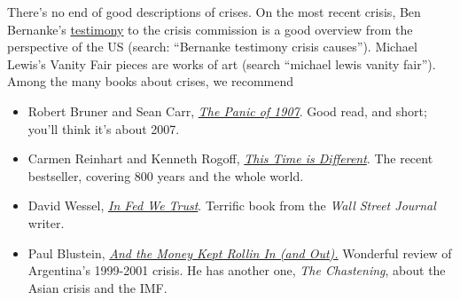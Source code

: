 There's no end of good descriptions of crises.
On the most recent crisis, Ben Bernanke's 
\href{http://www.federalreserve.gov/newsevents/testimony/Bernanke20100902a.htm}
{testimony} to the crisis commission is a good overview
from the perspective of the US
(search:  ``Bernanke
 testimony crisis causes'').
Michael Lewis's Vanity Fair pieces are works of art
(search ``michael lewis vanity fair'').
Among the many books about crises, we recommend
%
\begin{itemize}
\item Robert Bruner and Sean Carr,
\href{http://www.amazon.com/Panic-1907-Lessons-Learned-Markets/dp/0470452587/}
{\it The Panic of 1907\/}.
Good read, and short; you'll think it's about 2007.

\item Carmen Reinhart and Kenneth Rogoff,
\href{http://www.amazon.com/This-Time-Different-Centuries-ebook/dp/B004EYT932/}
{\it This Time is Different\/}.
The recent bestseller, covering 800 years and the whole world.

\item David Wessel,
\href{http://www.amazon.com/Fed-We-Trust-Bernankes-Great/dp/0307459683/}
{\it In Fed We Trust\/}.
Terrific book from the \emph{Wall Street Journal} writer.

\item Paul Blustein,
\href{http://www.amazon.com/dp/1586483811/}
    {\it And the Money Kept Rollin In (and Out).\/}
    Wonderful review of Argentina's 1999-2001 crisis.
    He has another one, {\it The Chastening\/}, about the Asian crisis
    and the IMF.

\end{itemize}
